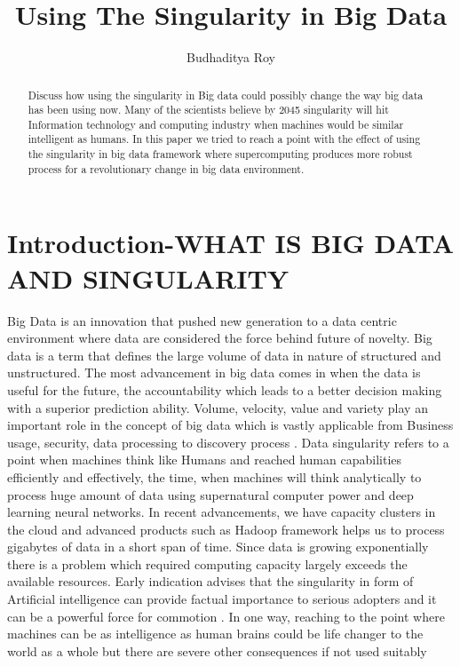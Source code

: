 \documentclass[sigconf]{acmart}
\begin{document}
\title{Using The Singularity in Big Data}


\author{Budhaditya Roy}

\renewcommand{\shortauthors}{B.Roy.}


\begin{abstract}
Discuss how using the singularity in Big data could possibly change the way big data has been using now. Many of the scientists believe by 2045 singularity will hit Information technology and computing industry when machines would be similar intelligent as humans. In this paper we tried to reach a point with the effect of using the singularity in big data framework where supercomputing produces more robust process for a revolutionary change in big data environment. 
\end{abstract}



\maketitle

\section{Introduction-WHAT IS BIG DATA AND SINGULARITY}
Big Data is an innovation that pushed new generation to a data centric environment where data are considered the force behind future of novelty. Big data is a term that defines the large volume of data in nature of structured and unstructured. The most advancement in big data comes in when the data is useful for the future, the accountability which leads to a better decision making with a superior prediction ability. Volume, velocity, value and variety play an important role in the concept of big data which is vastly applicable from Business usage, security, data processing to discovery process \cite{editor01}. Data singularity refers to a point when machines think like Humans and reached human capabilities efficiently and effectively, the time, when machines will think analytically to process huge amount of data using supernatural computer power and deep learning neural networks. In recent advancements, we have capacity clusters in the cloud and advanced products such as Hadoop framework helps us to process gigabytes of data in a short span of time. Since data is growing exponentially there is a problem which required computing capacity largely exceeds the available resources. Early indication advises that the singularity in form of Artificial intelligence can provide factual importance to serious adopters and it can be a powerful force for commotion \cite{editor01}. In one way, reaching to the point where machines can be as intelligence as human brains could be life changer to the world as a whole but there are severe other consequences if not used suitably
\end{document}
